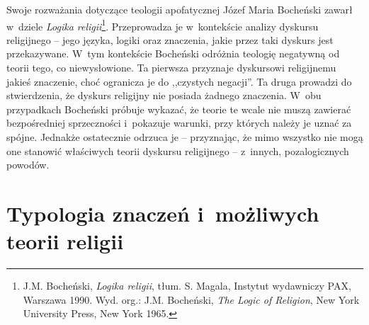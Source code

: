 Swoje rozważania dotyczące teologii apofatycznej Józef Maria Bocheński zawarł w~dziele \textit{Logika religii}\footnote{J.M. Bocheński, \textit{Logika religii}, tłum. S. Magala, Instytut wydawniczy PAX, Warszawa 1990. Wyd. org.: J.M. Bocheński, \textit{The Logic of Religion}, New York University Press, New York 1965.}. Przeprowadza je w~kontekście analizy dyskursu religijnego -- jego języka, logiki oraz znaczenia, jakie przez taki dyskurs jest przekazywane. W~tym kontekście Bocheński odróżnia teologię negatywną od teorii tego, co niewysłowione. Ta pierwsza przyznaje dyskursowi religijnemu jakieś znaczenie, choć ogranicza je do ,,czystych negacji''. Ta druga prowadzi do stwierdzenia, że dyskurs religijny nie posiada żadnego znaczenia. W~obu przypadkach Bocheński próbuje wykazać, że teorie te wcale nie muszą zawierać bezpośredniej sprzeczności i~pokazuje warunki, przy których należy je uznać za spójne. Jednakże ostatecznie odrzuca je -- przyznając, że mimo wszystko nie mogą one stanowić właściwych teorii dyskursu religijnego -- z~innych, pozalogicznych powodów.


\section{Typologia znaczeń i~możliwych teorii religii}\label{sil-boch-znaczteol}

